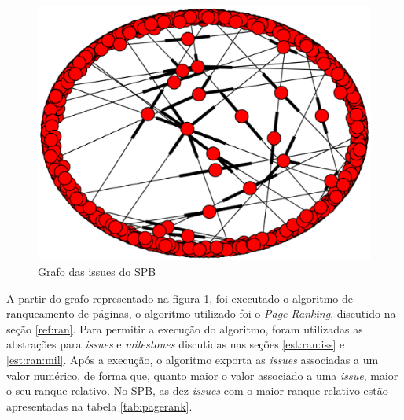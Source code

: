 \begin{figure}[h]
    \centering
        \includegraphics[keepaspectratio=true,scale=0.5]{figuras/graph.eps}
    \caption{Grafo das issues do SPB}
    \label{fig:graph}
\end{figure}

A partir do grafo representado na figura \ref{fig:graph}, foi executado o algoritmo de ranqueamento de páginas, o algoritmo utilizado foi o \textit{Page Ranking}, discutido na seção \ref{ref:ran}. Para permitir a execução do algoritmo, foram utilizadas as abstrações para \textit{issues} e \textit{milestones} discutidas nas seções \ref{est:ran:iss} e \ref{est:ran:mil}. Após a execução, o algoritmo exporta as \textit{issues} associadas a um valor numérico, de forma que, quanto maior o valor associado a uma \textit{issue}, maior o seu ranque relativo. No SPB, as dez \textit{issues} com o maior ranque relativo estão apresentadas na tabela \ref{tab:pagerank}. 

